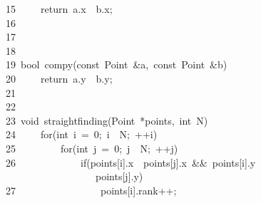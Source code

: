 \documentclass{article}
\newcommand{\hlstd}[1]{\textcolor[rgb]{0.2,0.2,0.2}{#1}}
\newcommand{\hlnum}[1]{\textcolor[rgb]{0.06,0.58,0.63}{#1}}
\newcommand{\hlopt}[1]{\textcolor[rgb]{0.2,0.2,0.2}{#1}}
\newcommand{\hllin}[1]{\textcolor[rgb]{0.59,0.59,0.59}{#1}}
\newcommand{\hlkwa}[1]{\textcolor[rgb]{0.23,0.42,0.78}{#1}}
\newcommand{\hlkwb}[1]{\textcolor[rgb]{0.63,0,0.31}{#1}}
\newcommand{\hlkwd}[1]{\textcolor[rgb]{0.78,0.23,0.41}{#1}}
\begin{document}
	\hllin{15\ }\hlstd{}\hlstd{\ \ \ \ }\hlstd{}\hlkwa{return\ }\hlstd{a}\hlopt{.}\hlstd{x\ }\hlopt{\usebox{\hlboxlessthan}\ }\hlstd{b}\hlopt{.}\hlstd{x}\hlopt{;}\\
	\hllin{16\ }\hlstd{}\\
	\hllin{17\ }\hlstd{}\hlopt{\usebox{\hlboxclosebrace}}\\
	\hllin{18\ }\hlstd{}\\
	\hllin{19\ }\hlstd{}\hlkwb{bool\ }\hlstd{}\hlkwd{comp\textunderscore y}\hlstd{}\hlopt{(}\hlstd{}\hlkwb{const\ }\hlstd{Point\ }\hlopt{\&}\hlstd{a}\hlopt{,\ }\hlstd{}\hlkwb{const\ }\hlstd{Point\ }\hlopt{\&}\hlstd{b}\hlopt{)\usebox{\hlboxopenbrace}}\\
	\hllin{20\ }\hlstd{}\hlstd{\ \ \ \ }\hlstd{}\hlkwa{return\ }\hlstd{a}\hlopt{.}\hlstd{y\ }\hlopt{\usebox{\hlboxlessthan}\ }\hlstd{b}\hlopt{.}\hlstd{y}\hlopt{;}\\
	\hllin{21\ }\hlstd{}\hlopt{\usebox{\hlboxclosebrace}}\\
	\hllin{22\ }\hlstd{}\\
	\hllin{23\ }\hlstd{}\hlkwb{void\ }\hlstd{}\hlkwd{straight\textunderscore finding}\hlstd{}\hlopt{(}\hlstd{Point\ }\hlopt{{*}}\hlstd{points}\hlopt{,\ }\hlstd{}\hlkwb{int\ }\hlstd{N}\hlopt{)\usebox{\hlboxopenbrace}}\\
	\hllin{24\ }\hlstd{}\hlstd{\ \ \ \ }\hlstd{}\hlkwa{for}\hlstd{}\hlopt{(}\hlstd{}\hlkwb{int\ }\hlstd{i\ }\hlopt{=\ }\hlstd{}\hlnum{0}\hlstd{}\hlopt{;\ }\hlstd{i\ }\hlopt{\usebox{\hlboxlessthan}\ }\hlstd{N}\hlopt{;\ ++}\hlstd{i}\hlopt{)\usebox{\hlboxopenbrace}}\\
	\hllin{25\ }\hlstd{}\hlstd{\ \ \ \ \ \ \ \ }\hlstd{}\hlkwa{for}\hlstd{}\hlopt{(}\hlstd{}\hlkwb{int\ }\hlstd{j\ }\hlopt{=\ }\hlstd{}\hlnum{0}\hlstd{}\hlopt{;\ }\hlstd{j\ }\hlopt{\usebox{\hlboxlessthan}\ }\hlstd{N}\hlopt{;\ ++}\hlstd{j}\hlopt{)\usebox{\hlboxopenbrace}}\\
	\hllin{26\ }\hlstd{}\hlstd{\ \ \ \ \ \ \ \ \ \ \ \ }\hlstd{}\hlkwa{if}\hlstd{}\hlopt{(}\hlstd{points}\hlopt{{[}}\hlstd{i}\hlopt{{]}.}\hlstd{x\ }\hlopt{\usebox{\hlboxgreaterthan}\ }\hlstd{points}\hlopt{{[}}\hlstd{j}\hlopt{{]}.}\hlstd{x\ }\hlopt{\&\&\ }\hlstd{points}\hlopt{{[}}\hlstd{i}\hlopt{{]}.}\hlstd{y\ }\hlopt{\usebox{\hlboxgreaterthan}\ }\\
	\hllin{\ \ \ }\hlstd{}\hlstd{\ \ \ \ \ \ \ \ \ \ \ \ \ \ \ }\hlstd{points}\hlopt{{[}}\hlstd{j}\hlopt{{]}.}\hlstd{y}\hlopt{)\usebox{\hlboxopenbrace}}\Righttorque\\
	\hllin{27\ }\hlstd{}\hlstd{\ \ \ \ \ \ \ \ \ \ \ \ \ \ \ \ }\hlstd{points}\hlopt{{[}}\hlstd{i}\hlopt{{]}.}\hlstd{rank}\hlopt{++;}\\
\end{document}
